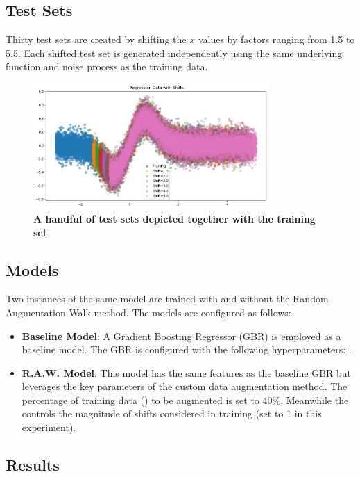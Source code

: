 \subsection{Test Sets}
Thirty test sets are created by shifting the $x$ values by factors ranging from 1.5 to 5.5. Each shifted test set is generated independently using the same underlying function and noise process as the training data.
\begin{figure}[H]
    \centering
    \includegraphics[width=0.8\textwidth]{assets/reg_shift_plot.png} 
    \caption{\textbf{A handful of test sets depicted together with the training set}}
    \label{fig:reg-shift-plot}
\end{figure}

\subsection{Models}
Two instances of the same model are trained with and without the Random Augmentation Walk method. The models are configured as follows:
\begin{itemize}
    \item \textbf{Baseline Model}: A Gradient Boosting Regressor (GBR) is employed as a baseline model. The GBR is configured with the following hyperparameters: .
    \item \textbf{R.A.W. Model}: This model has the same features as the baseline GBR but leverages the key parameters of the custom data augmentation method. The percentage of training data () to be augmented is set to 40\%. Meanwhile the  controls the magnitude of shifts considered in training (set to 1 in this experiment).
\end{itemize}




\subsection{\textbf{Results}}

